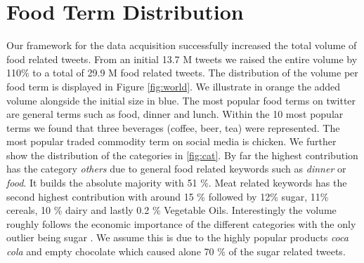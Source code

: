 \section {Food Term Distribution}

Our framework for the data acquisition successfully increased the total volume of food related tweets. From an initial 13.7 M tweets we raised the entire volume by 110\% to a total of 29.9 M food related tweets. The distribution of the volume per food term is displayed in Figure \ref{fig:world}. We illustrate in orange the added volume alongside the initial size in blue. The most popular food terms on twitter are general terms such as food, dinner and lunch. Within the 10 most popular terms we found that three beverages (coffee, beer, tea) were represented. The most popular traded commodity term on social media is chicken.  We further show the distribution of the categories in \ref{fig:cat}. By far the highest contribution has the category \emph{others} due to general food related keywords such as \emph{dinner} or \emph{food}. It builds the absolute majority with 51 \%. Meat related keywords has the second highest contribution with around 15 \% followed by 12\% sugar, 11\%  cereals, 10 \% dairy  and lastly 0.2 \% Vegetable Oils. Interestingly the volume roughly follows the economic importance of the different categories with the only outlier being sugar \cite{fao2008}. We assume this is due to the highly popular products \emph{coca cola} and empty	{chocolate} which caused alone 70 \% of the sugar related tweets. 



